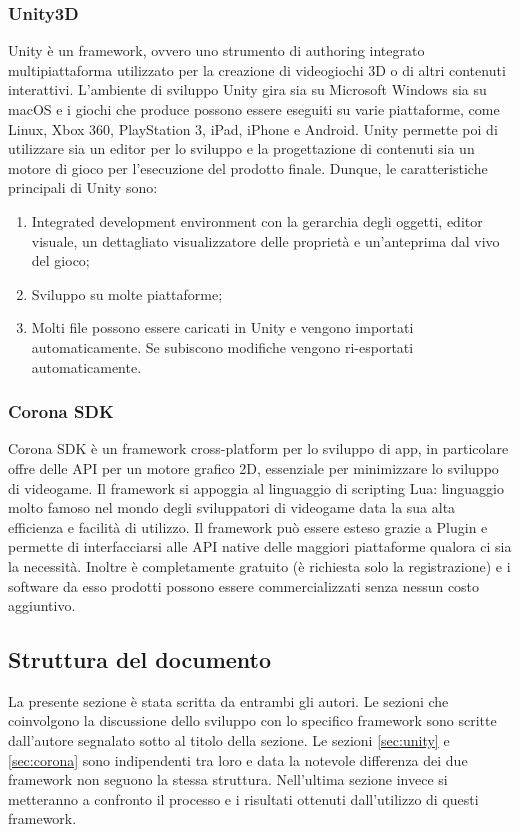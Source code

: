 		\subsubsection{Unity3D}
			Unity è un framework, ovvero uno strumento di authoring integrato multipiattaforma utilizzato per la creazione di videogiochi 3D o di altri contenuti interattivi. 
			L'ambiente di sviluppo Unity gira sia su Microsoft Windows sia su macOS e i giochi che produce possono essere eseguiti su varie piattaforme, come Linux, Xbox 360, PlayStation 3, iPad, iPhone e Android. 
			Unity permette poi di utilizzare sia un editor per lo sviluppo e la progettazione di contenuti sia un motore di gioco per l'esecuzione del prodotto finale. 
			Dunque, le caratteristiche principali di Unity sono:
			\begin{enumerate}
				\item Integrated development environment con la gerarchia degli oggetti, editor visuale, un dettagliato visualizzatore delle proprietà e un'anteprima dal vivo del gioco;
				\item Sviluppo su molte piattaforme;
				\item Molti file possono essere caricati in Unity e vengono importati automaticamente. Se subiscono modifiche vengono ri-esportati automaticamente.
			\end{enumerate}
		
		\subsubsection{Corona SDK}
			Corona SDK è un framework cross-platform per lo sviluppo di app, in particolare offre delle API per un motore grafico 2D, essenziale per minimizzare lo sviluppo di videogame. Il framework si appoggia al linguaggio di scripting Lua: linguaggio molto famoso nel mondo degli sviluppatori di videogame data la sua alta efficienza e facilità di utilizzo. Il framework può essere esteso grazie a Plugin e permette di interfacciarsi alle API native delle maggiori piattaforme qualora ci sia la necessità. Inoltre è completamente gratuito (è richiesta solo la registrazione) e i software da esso prodotti possono essere commercializzati senza nessun costo aggiuntivo.
		
		
	\subsection{Struttura del documento}
		La presente sezione è stata scritta da entrambi gli autori. Le sezioni che coinvolgono la discussione dello sviluppo con lo specifico framework sono scritte dall'autore segnalato sotto al titolo della sezione. Le sezioni \ref{sec:unity} e \ref{sec:corona} sono indipendenti tra loro e data la notevole differenza dei due framework non seguono la stessa struttura. Nell'ultima sezione invece si metteranno a confronto il processo e i risultati ottenuti dall'utilizzo di questi framework.
		
